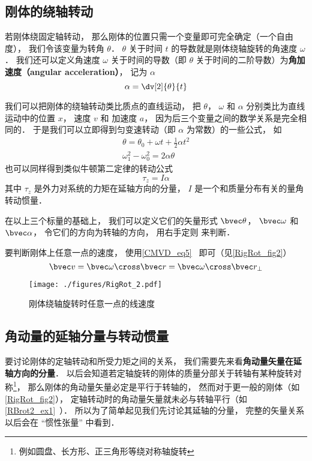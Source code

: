 

\subsection{刚体的绕轴转动}
若刚体绕固定轴转动， 那么刚体的位置只需一个变量即可完全确定（一个自由度）， 我们令该变量为转角 $\theta$． $\theta$ 关于时间 $t$ 的导数就是刚体绕轴旋转的角速度 $\omega$． 我们还可以定义角速度 $\omega$ 关于时间的导数（即 $\theta$ 关于时间的二阶导数）为\textbf{角加速度（angular acceleration）}， 记为 $\alpha$
\begin{equation}
\alpha = \dv[2]{\theta}{t}
\end{equation}

我们可以把刚体的绕轴转动类比质点的直线运动， 把 $\theta$， $\omega$ 和 $\alpha$ 分别类比为直线运动中的位置 $x$， 速度 $v$ 和 加速度 $a$， 因为后三个变量之间的数学关系是完全相同的． 于是我们可以立即得到匀变速转动（即 $\alpha$ 为常数）的一些公式， 如
\begin{gather}
\theta = \theta_0 + \omega t + \frac12 \alpha t^2\\
\omega_1^2 - \omega_0^2 = 2\alpha \theta
\end{gather}
也可以同样得到类似牛顿第二定律的转动公式
\begin{equation}
\tau_z = I \alpha
\end{equation}
其中 $\tau_z$ 是外力对系统的力矩在延轴方向的分量， $I$ 是一个和质量分布有关的量角转动惯量．

在以上三个标量的基础上， 我们可以定义它们的矢量形式 $\bvec \theta$， $\bvec \omega$ 和 $\bvec \alpha$， 令它们的方向为转轴的方向， 用右手定则 来判断．

要判断刚体上任意一点的速度， 使用\autoref{CMVD_eq5}~ 即可（见\autoref{RigRot_fig2}）
\begin{equation}
\bvec v = \bvec \omega \cross \bvec r = \bvec \omega \cross \bvec r_\bot
\end{equation}

\begin{figure}[ht]
\centering
\texttt{[image: ./figures/RigRot\_2.pdf]}
\caption{刚体绕轴旋转时任意一点的线速度} \label{RigRot_fig2}
\end{figure}

\subsection{角动量的延轴分量与转动惯量}
要讨论刚体的定轴转动和所受力矩之间的关系， 我们需要先来看\textbf{角动量矢量在延轴方向的分量}． 以后会知道若定轴旋转的刚体的质量分部关于转轴有某种旋转对称\footnote{例如圆盘、长方形、正三角形等绕对称轴旋转}， 那么刚体的角动量矢量必定是平行于转轴的， 然而对于更一般的刚体（如\autoref{RigRot_fig2}）， 定轴转动时的角动量矢量就未必与转轴平行（如\autoref{RBrot2_ex1}~）． 所以为了简单起见我们先讨论其延轴的分量， 完整的矢量关系以后会在 “惯性张量” 中看到．

